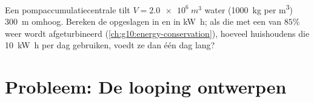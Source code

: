 \begin{exercise}[$\star\star\star$]\label{exo:g11:mechanical-energy:15}
Een pompaccumulatiecentrale tilt $V = \qty{2.0e6}{m^3}$ water
(\qty{1000}{kg} per \unit{m^3}) \qty{300}{m} omhoog. Bereken de
opgeslagen  in  en in \unit{kW.h}; als die met een 
van $85\%$ weer wordt afgeturbineerd
(\cref{ch:g10:energy-conservation}), hoeveel huishoudens die
\qty{10}{kW.h} per dag gebruiken, voedt ze dan één dag lang?
\end{exercise}

\section{Probleem: De looping ontwerpen}

